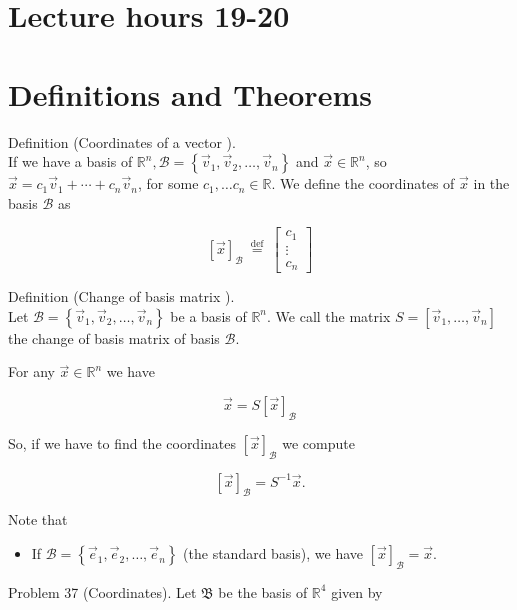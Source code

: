 \documentclass[10pt]{article}
\begin{document}
\section*{Lecture hours 19-20}
\section*{Definitions and Theorems}
Definition (Coordinates of a vector ).\\
If we have a basis of $\mathbb{R}^{n}, \mathcal{B}=\left\{\vec{v}_{1}, \vec{v}_{2}, \ldots, \vec{v}_{n}\right\}$ and $\vec{x} \in \mathbb{R}^{n}$, so $\vec{x}=c_{1} \vec{v}_{1}+\cdots+c_{n} \vec{v}_{n}$, for some $c_{1}, \ldots c_{n} \in \mathbb{R}$. We define the coordinates of $\vec{x}$ in the basis $\mathcal{B}$ as

$$
[\vec{x}]_{\mathcal{B}} \stackrel{\text { def }}{=}\left[\begin{array}{c}
c_{1} \\
\vdots \\
c_{n}
\end{array}\right]
$$

Definition (Change of basis matrix ).\\
Let $\mathcal{B}=\left\{\vec{v}_{1}, \vec{v}_{2}, \ldots, \vec{v}_{n}\right\}$ be a basis of $\mathbb{R}^{n}$. We call the matrix $S=\left[\vec{v}_{1}, \ldots, \vec{v}_{n}\right]$ the change of basis matrix of basis $\mathcal{B}$.

For any $\vec{x} \in \mathbb{R}^{n}$ we have

$$
\vec{x}=S[\vec{x}]_{\mathcal{B}}
$$

So, if we have to find the coordinates $[\vec{x}]_{\mathcal{B}}$ we compute

$$
[\vec{x}]_{\mathcal{B}}=S^{-1} \vec{x} .
$$

Note that

\begin{itemize}
  \item If $\mathcal{B}=\left\{\vec{e}_{1}, \vec{e}_{2}, \ldots, \vec{e}_{n}\right\}$ (the standard basis), we have $[\vec{x}]_{\mathcal{B}}=\vec{x}$.
\end{itemize}

Problem 37 (Coordinates). Let $\mathfrak{B}$ be the basis of $\mathbb{R}^{4}$ given by
\end{document}
